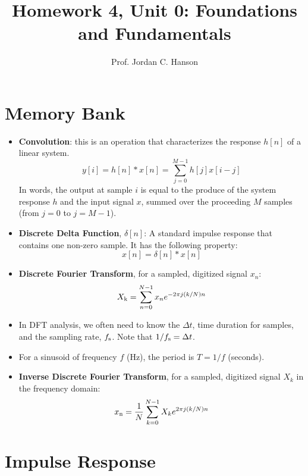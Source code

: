 \documentclass{article}
\begin{document}
\twocolumn

\title{Homework 4, Unit 0: Foundations and Fundamentals}
\author{Prof. Jordan C. Hanson}

\maketitle

\section{Memory Bank}
\small
\begin{itemize}
\item \textbf{Convolution}: this is an operation that characterizes the response $h[n]$ of a linear system.
\begin{equation}
y[i] = h[n] * x[n] = \sum_{j=0}^{M-1}h[j]x[i-j] \label{eq:conv}
\end{equation}
In words, the output at sample $i$ is equal to the produce of the system response $h$ and the input signal $x$, summed over the proceeding $M$ samples (from $j=0$ to $j=M-1$).
\item \textbf{Discrete Delta Function}, $\delta[n]$: A standard impulse response that contains one non-zero sample.  It has the following property:
\begin{equation}
x[n] = \delta[n] * x[n] \label{eq:conv2}
\end{equation}
\item \textbf{Discrete Fourier Transform}, for a sampled, digitized signal $x_n$:
\begin{equation}
X_{\rm k} = \sum_{n=0}^{N-1} x_n e^{-2\pi j (k/N) n} \label{eq:dft}
\end{equation}
\item In DFT analysis, we often need to know the $\Delta t$, time duration for samples, and the sampling rate, $f_{\rm s}$.  Note that $1/f_{\rm s} = \Delta t$.
\item For a sinusoid of frequency $f$ (Hz), the period is $T = 1/f$ (seconds).
\item \textbf{Inverse Discrete Fourier Transform}, for a sampled, digitized signal $X_k$ in the frequency domain:
\begin{equation}
x_{\rm n} = \frac{1}{N} \sum_{k=0}^{N-1} X_k e^{2\pi j (k/N) n} \label{eq:dft2}
\end{equation}
\end{itemize}
\normalsize

\section{Impulse Response}
\end{document}
